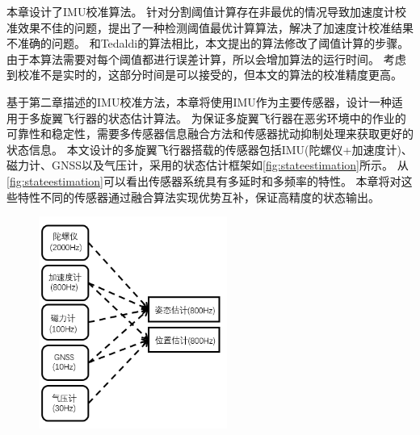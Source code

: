 \documentclass[
  type=master
]{gdutthesis}
\begin{document}
本章设计了IMU校准算法。
针对分割阈值计算存在非最优的情况导致加速度计校准效果不佳的问题，提出了一种检测阈值最优计算算法，解决了加速度计校准结果不准确的问题。
和Tedaldi的算法相比，本文提出的算法修改了阈值计算的步骤。
由于本算法需要对每个阈值都进行误差计算，所以会增加算法的运行时间。
考虑到校准不是实时的，这部分时间是可以接受的，但本文的算法的校准精度更高。

基于第二章描述的IMU校准方法，本章将使用IMU作为主要传感器，设计一种适用于多旋翼飞行器的状态估计算法。
为保证多旋翼飞行器在恶劣环境中的作业的可靠性和稳定性，需要多传感器信息融合方法和传感器扰动抑制处理来获取更好的状态信息。
本文设计的多旋翼飞行器搭载的传感器包括IMU(陀螺仪+加速度计)、磁力计、GNSS以及气压计，采用的状态估计框架如\autoref{fig:stateestimation}所示。
从\autoref{fig:stateestimation}可以看出传感器系统具有多延时和多频率的特性。
本章将对这些特性不同的传感器通过融合算法实现优势互补，保证高精度的状态输出。
\begin{figure}[H]
	\centering
	\includegraphics[width=0.55\textwidth]{屏幕截图 2022-06-08 110601.png}
	\label{fig:stateestimation}
\end{figure} 
\end{document}

